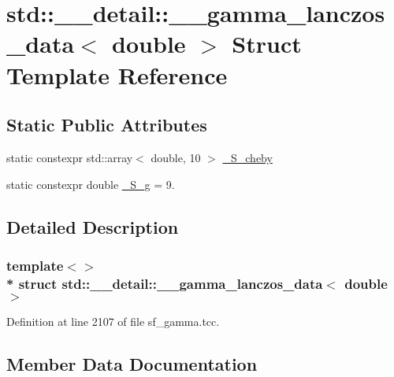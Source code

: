\hypertarget{structstd_1_1____detail_1_1____gamma__lanczos__data_3_01double_01_4}{}\section{std\+:\+:\+\_\+\+\_\+detail\+:\+:\+\_\+\+\_\+gamma\+\_\+lanczos\+\_\+data$<$ double $>$ Struct Template Reference}
\label{structstd_1_1____detail_1_1____gamma__lanczos__data_3_01double_01_4}
\subsection*{Static Public Attributes}
\begin{DoxyCompactItemize}
\item 
static constexpr std\+::array$<$ double, 10 $>$ \hyperlink{structstd_1_1____detail_1_1____gamma__lanczos__data_3_01double_01_4_a315868c6a789a5e7455f7eb4d8d86115}{\+\_\+\+S\+\_\+cheby}
\item 
static constexpr double \hyperlink{structstd_1_1____detail_1_1____gamma__lanczos__data_3_01double_01_4_ab7959ed84fcc00db67df8b167165513d}{\+\_\+\+S\+\_\+g} = 9.
\end{DoxyCompactItemize}


\subsection{Detailed Description}
\subsubsection*{template$<$$>$\\*
struct std\+::\+\_\+\+\_\+detail\+::\+\_\+\+\_\+gamma\+\_\+lanczos\+\_\+data$<$ double $>$}



Definition at line 2107 of file sf\+\_\+gamma.\+tcc.



\subsection{Member Data Documentation}
